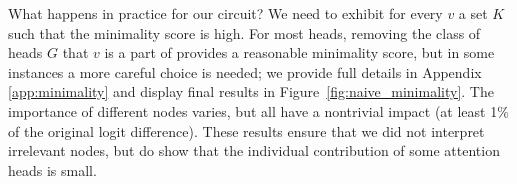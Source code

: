



What happens in practice for our circuit? We need to exhibit for every $v$ a set $K$ such that the minimality score is high. %
For most heads, removing the class of heads $G$ that $v$ is a part of provides a reasonable minimality score, but in some instances a more careful choice is needed; we provide full details in Appendix \ref{app:minimality} and display final results in Figure~\ref{fig:naive_minimality}. The importance of different nodes varies, but all have a nontrivial impact (at least 1\% of the original logit difference). These results ensure that we did not interpret irrelevant nodes, but do show that the individual contribution of some attention heads is small. %



